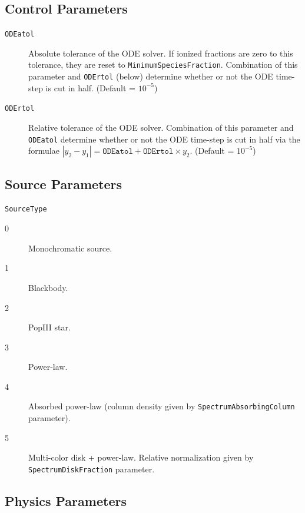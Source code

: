 \documentclass[letterpaper,titlepage,12pt]{article}
\numberwithin{equation}{section}
\begin{document}
\subsection{Control Parameters}

\begin{description}
    
\item [\texttt{ODEatol}] Absolute tolerance of the ODE solver.  If ionized fractions are zero to this tolerance, they are reset to \texttt{MinimumSpeciesFraction}.  Combination of this parameter and \texttt{ODErtol} (below) determine whether or not the ODE time-step is cut in half. (Default = $10^{-5}$)

\item [\texttt{ODErtol}]
Relative tolerance of the ODE solver.  Combination of this parameter and \texttt{ODEatol} determine whether or not the ODE time-step is cut in half via the formulae $|y_2 - y_1| = \texttt{ODEatol} + \texttt{ODErtol}\times y_2$. (Default = $10^{-5}$)
 

\end{description}


\subsection{Source Parameters}

\begin{description}
    
\item \texttt{SourceType}
\begin{description}
    \item [0] Monochromatic source.
    \item [1] Blackbody.  
    \item [2] PopIII star.  
    \item [3] Power-law.        
    \item [4] Absorbed power-law (column density given by \texttt{SpectrumAbsorbingColumn} parameter).
    \item [5] Multi-color disk + power-law. Relative normalization given by \texttt{SpectrumDiskFraction} parameter.                
\end{description}    

\end{description}


\subsection{Physics Parameters} \label{sec:PhysicsParameters}
\end{document}
